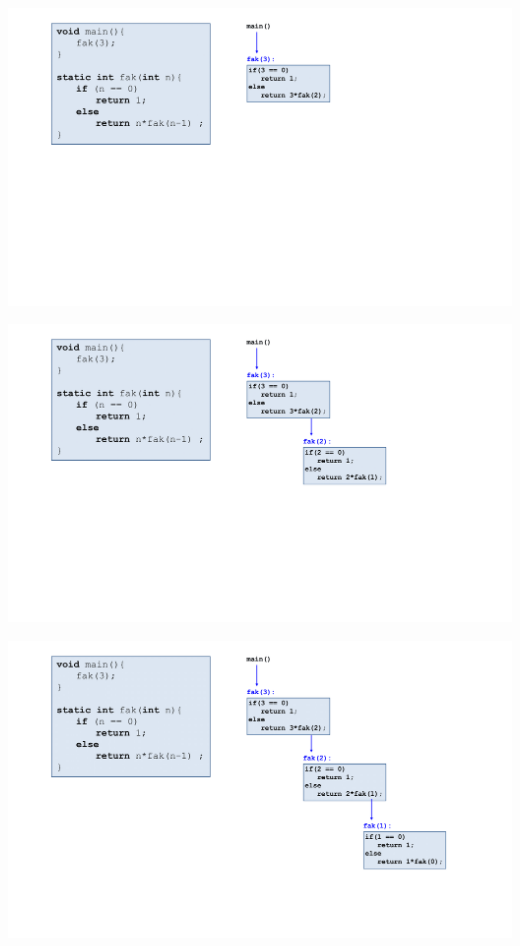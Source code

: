 \documentclass{beamer}
\begin{document}
\begin{frame}
    \begin{center}
           \includegraphics[width=1.1\textwidth]{rekursion anlage/07_Rekursion-04.png}
    \end{center}
\end{frame}
\begin{frame}
    \begin{center}
           \includegraphics[width=1.1\textwidth]{rekursion anlage/07_Rekursion-05.png}
    \end{center}
\end{frame}
\begin{frame}
    \begin{center}
           \includegraphics[width=1.1\textwidth]{rekursion anlage/07_Rekursion-06.png}
    \end{center}
\end{frame}
\end{document}
